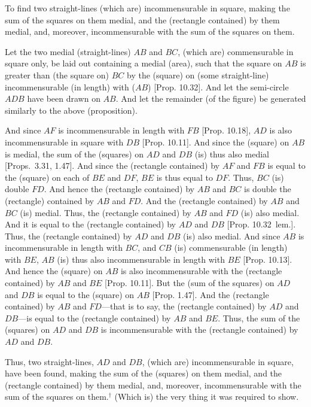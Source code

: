 \begin{Parallel}{}{}
{To find two straight-lines (which are) incommensurable in square, making the sum of the squares on them medial,
and the (rectangle contained) by them medial, and, moreover,
incommensurable  with the sum of the squares on them.

\centerline{}

Let the two medial (straight-lines) $AB$ and $BC$, (which are) commensurable in square only, be laid out containing a medial (area), such
that the square on $AB$ is greater than (the square on) $BC$ by the
(square) on (some straight-line) incommensurable (in length) with ($AB$) [Prop. 10.32].  And let the semi-circle
$ADB$ have been drawn on $AB$. And let the remainder (of the figure)
be generated similarly to the above (proposition).

And since $AF$ is incommensurable in length with $FB$ [Prop. 10.18], $AD$
is also incommensurable in square with $DB$ [Prop. 10.11]. And since the (square) on $AB$ is
medial, the sum of the (squares) on $AD$ and $DB$ (is) thus also
medial [Props.~3.31, 1.47]. And since the (rectangle
contained) by $AF$ and $FB$ is equal to the (square) on each of $BE$ and
$DF$, $BE$ is thus equal to $DF$. Thus, $BC$ (is) double $FD$. And
hence the (rectangle contained) by $AB$ and $BC$ is double the
(rectangle) contained by $AB$ and $FD$. And the (rectangle contained)
by $AB$ and $BC$ (is) medial. Thus, the (rectangle contained) by $AB$
and $FD$ (is) also medial. And it is equal to the (rectangle contained) 
by $AD$ and $DB$ [Prop. 10.32~lem.]. Thus, the
(rectangle contained) by $AD$ and $DB$ (is) also medial.
And since $AB$ is incommensurable in length with $BC$, and $CB$
(is) commensurable (in length) with $BE$, $AB$ (is) thus also incommensurable
in length with $BE$ [Prop. 10.13]. And hence the (square) on $AB$ is also incommensurable with the (rectangle contained) by $AB$ and $BE$ [Prop. 10.11]. But the (sum of the squares) on $AD$ and
$DB$ is equal to the (square) on $AB$ [Prop. 1.47].
And the (rectangle contained) by $AB$ and $FD$---that is to say, the (rectangle contained) by $AD$ and $DB$---is equal to the
(rectangle contained) by $AB$ and $BE$. Thus, the sum of the (squares) on
$AD$ and $DB$ is incommensurable with the (rectangle contained) by
$AD$ and $DB$.

Thus, two straight-lines, $AD$ and $DB$, (which are) incommensurable
in square, have been found, making the sum of the (squares) on them
medial, and the (rectangle contained) by them medial, and, moreover, 
incommensurable  with the sum of the squares on them.$^\dag$
 (Which is) the
very thing it was required to show.}
\end{Parallel}


